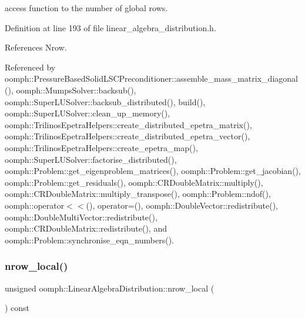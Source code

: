 access function to the number of global rows. 



Definition at line 193 of file linear\+\_\+algebra\+\_\+distribution.\+h.



References Nrow.



Referenced by oomph\+::\+Pressure\+Based\+Solid\+L\+S\+C\+Preconditioner\+::assemble\+\_\+mass\+\_\+matrix\+\_\+diagonal(), oomph\+::\+Mumps\+Solver\+::backsub(), oomph\+::\+Super\+L\+U\+Solver\+::backsub\+\_\+distributed(), build(), oomph\+::\+Super\+L\+U\+Solver\+::clean\+\_\+up\+\_\+memory(), oomph\+::\+Trilinos\+Epetra\+Helpers\+::create\+\_\+distributed\+\_\+epetra\+\_\+matrix(), oomph\+::\+Trilinos\+Epetra\+Helpers\+::create\+\_\+distributed\+\_\+epetra\+\_\+vector(), oomph\+::\+Trilinos\+Epetra\+Helpers\+::create\+\_\+epetra\+\_\+map(), oomph\+::\+Super\+L\+U\+Solver\+::factorise\+\_\+distributed(), oomph\+::\+Problem\+::get\+\_\+eigenproblem\+\_\+matrices(), oomph\+::\+Problem\+::get\+\_\+jacobian(), oomph\+::\+Problem\+::get\+\_\+residuals(), oomph\+::\+C\+R\+Double\+Matrix\+::multiply(), oomph\+::\+C\+R\+Double\+Matrix\+::multiply\+\_\+transpose(), oomph\+::\+Problem\+::ndof(), oomph\+::operator$<$$<$(), operator=(), oomph\+::\+Double\+Vector\+::redistribute(), oomph\+::\+Double\+Multi\+Vector\+::redistribute(), oomph\+::\+C\+R\+Double\+Matrix\+::redistribute(), and oomph\+::\+Problem\+::synchronise\+\_\+eqn\+\_\+numbers().

\mbox{\label{classoomph_1_1LinearAlgebraDistribution_ac9310de740f9c3a61f8d5dab9bef88ca}} 
\subsubsection{\texorpdfstring{nrow\+\_\+local()}{nrow\_local()}\hspace{0.1cm}{\footnotesize\ttfamily [1/2]}}
{\footnotesize\ttfamily unsigned oomph\+::\+Linear\+Algebra\+Distribution\+::nrow\+\_\+local (\begin{DoxyParamCaption}{ }\end{DoxyParamCaption}) const\hspace{0.3cm}{\ttfamily [inline]}}



